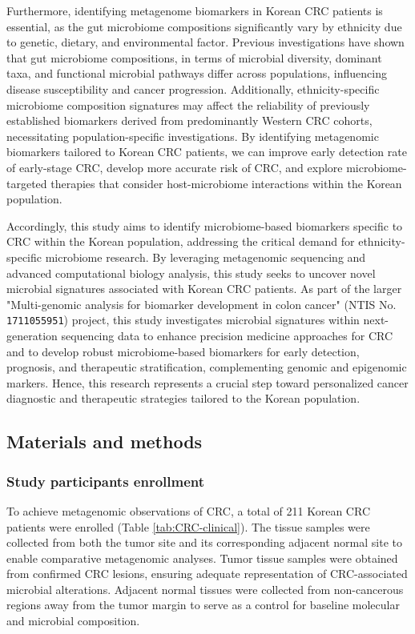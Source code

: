 \documentclass[11pt, a4paper, onecolumn, oneside]{report}
\begin{document}
            Furthermore, identifying metagenome biomarkers in Korean CRC patients is essential, as the gut microbiome compositions significantly vary by ethnicity due to genetic, dietary, and environmental factor. Previous investigations have shown that gut microbiome compositions, in terms of microbial diversity, dominant taxa, and functional microbial pathways differ across populations, influencing disease susceptibility and cancer progression. Additionally, ethnicity-specific microbiome composition signatures may affect the reliability of previously established biomarkers derived from predominantly Western CRC cohorts, necessitating population-specific investigations. By identifying metagenomic biomarkers tailored to Korean CRC patients, we can improve early detection rate of early-stage CRC, develop more accurate risk of CRC, and explore microbiome-targeted therapies that consider host-microbiome interactions within the Korean population.

            Accordingly, this study aims to identify microbiome-based biomarkers specific to CRC within the Korean population, addressing the critical demand for ethnicity-specific microbiome research. By leveraging metagenomic sequencing and advanced computational biology analysis, this study seeks to uncover novel microbial signatures associated with Korean CRC patients. As part of the larger "Multi-genomic analysis for biomarker development in colon cancer" (NTIS No. \texttt{1711055951}) project, this study investigates microbial signatures within next-generation sequencing data to enhance precision medicine approaches for CRC and to develop robust microbiome-based biomarkers for early detection, prognosis, and therapeutic stratification, complementing genomic and epigenomic markers. Hence, this research represents a crucial step toward personalized cancer diagnostic and therapeutic strategies tailored to the Korean population.
        \clearpage

        \subsection{Materials and methods}
            \subsubsection{Study participants enrollment}
                To achieve metagenomic observations of CRC, a total of 211 Korean CRC patients were enrolled (Table \ref{tab:CRC-clinical}). The tissue samples were collected from both the tumor site and its corresponding adjacent normal site to enable comparative metagenomic analyses. Tumor tissue samples were obtained from confirmed CRC lesions, ensuring adequate representation of CRC-associated microbial alterations. Adjacent normal tissues were collected from non-cancerous regions away from the tumor margin to serve as a control for baseline molecular and microbial composition.
\end{document}
